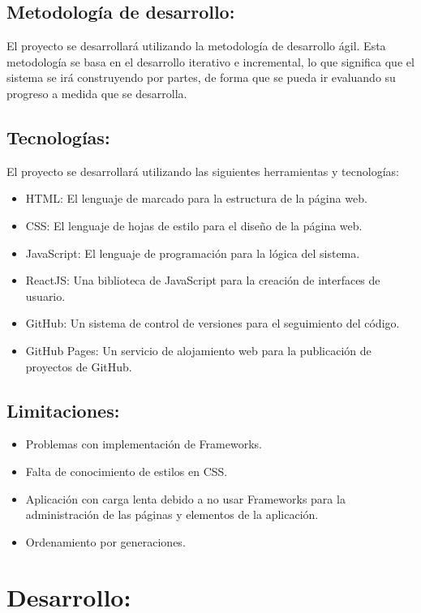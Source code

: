 \documentclass[12pt]{article}
\begin{document}
        \subsection{Metodología de desarrollo: }
        El proyecto se desarrollará utilizando la metodología de desarrollo ágil. Esta metodología se basa en el desarrollo iterativo e incremental, lo que significa que el sistema se irá construyendo por partes, de forma que se pueda ir evaluando su progreso a medida que se desarrolla.
        \subsection{Tecnologías: }
        El proyecto se desarrollará utilizando las siguientes herramientas y tecnologías:
        \begin{itemize}
            \item HTML: El lenguaje de marcado para la estructura de la página web.
            \item CSS: El lenguaje de hojas de estilo para el diseño de la página web.
            \item JavaScript: El lenguaje de programación para la lógica del sistema.
            \item ReactJS: Una biblioteca de JavaScript para la creación de interfaces de usuario.
            \item GitHub: Un sistema de control de versiones para el seguimiento del código.
            \item GitHub Pages: Un servicio de alojamiento web para la publicación de proyectos de GitHub.
        \end{itemize}
        \subsection{Limitaciones:}
        \begin{itemize}
            \item Problemas con implementación de Frameworks.
            \item Falta de conocimiento de estilos en CSS.
            \item Aplicación con carga lenta debido a no usar Frameworks para la administración de las páginas y elementos de la aplicación.
            \item Ordenamiento por generaciones.
        \end{itemize}
    \section{Desarrollo:}
\end{document}
